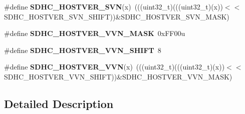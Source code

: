 \begin{DoxyCompactItemize}
\item 
\#define {\bfseries S\+D\+H\+C\+\_\+\+H\+O\+S\+T\+V\+E\+R\+\_\+\+S\+VN}(x)~(((uint32\+\_\+t)(((uint32\+\_\+t)(x))$<$$<$S\+D\+H\+C\+\_\+\+H\+O\+S\+T\+V\+E\+R\+\_\+\+S\+V\+N\+\_\+\+S\+H\+I\+FT))\&S\+D\+H\+C\+\_\+\+H\+O\+S\+T\+V\+E\+R\+\_\+\+S\+V\+N\+\_\+\+M\+A\+SK)\hypertarget{group__SDHC__Register__Masks_gabc6936d685c8222c70b386e4d59e230a}{}\label{group__SDHC__Register__Masks_gabc6936d685c8222c70b386e4d59e230a}

\item 
\#define {\bfseries S\+D\+H\+C\+\_\+\+H\+O\+S\+T\+V\+E\+R\+\_\+\+V\+V\+N\+\_\+\+M\+A\+SK}~0x\+F\+F00u\hypertarget{group__SDHC__Register__Masks_ga8fd5f14b61267f8ef598236b95cb3b7d}{}\label{group__SDHC__Register__Masks_ga8fd5f14b61267f8ef598236b95cb3b7d}

\item 
\#define {\bfseries S\+D\+H\+C\+\_\+\+H\+O\+S\+T\+V\+E\+R\+\_\+\+V\+V\+N\+\_\+\+S\+H\+I\+FT}~8\hypertarget{group__SDHC__Register__Masks_ga706bd372f8258fdf62c2e50ff2c5ee99}{}\label{group__SDHC__Register__Masks_ga706bd372f8258fdf62c2e50ff2c5ee99}

\item 
\#define {\bfseries S\+D\+H\+C\+\_\+\+H\+O\+S\+T\+V\+E\+R\+\_\+\+V\+VN}(x)~(((uint32\+\_\+t)(((uint32\+\_\+t)(x))$<$$<$S\+D\+H\+C\+\_\+\+H\+O\+S\+T\+V\+E\+R\+\_\+\+V\+V\+N\+\_\+\+S\+H\+I\+FT))\&S\+D\+H\+C\+\_\+\+H\+O\+S\+T\+V\+E\+R\+\_\+\+V\+V\+N\+\_\+\+M\+A\+SK)\hypertarget{group__SDHC__Register__Masks_ga41ed3752ccdbb977313a4b1c8c2574c2}{}\label{group__SDHC__Register__Masks_ga41ed3752ccdbb977313a4b1c8c2574c2}

\end{DoxyCompactItemize}


\subsection{Detailed Description}
